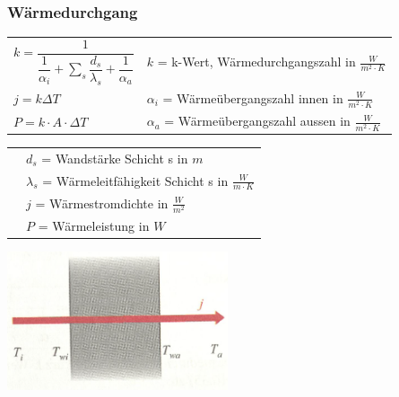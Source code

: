		\subsubsection{Wärmedurchgang}
			\begin{minipage}{12cm}
					\renewcommand{\arraystretch}{2.5}
					\begin{tabular}{ p{4cm} | p{7cm}}
						$k = \dfrac{1}{\dfrac{1}{\alpha_i} + \sum\limits_{s}\dfrac{d_s}{\lambda_s} + \dfrac{1}{\alpha_a}}$	&	$k$ = k-Wert, Wärmedurchgangszahl in $\frac{W}{m^2 \cdot K}$\\
						$j = k \Delta T$	&	$\alpha_i$ = Wärmeübergangszahl innen in $\frac{W}{m^2 \cdot K}$\\
						$P = k \cdot A \cdot \Delta T$	& $\alpha_a$ = Wärmeübergangszahl aussen in $\frac{W}{m^2 \cdot K}$\\
					\end{tabular}
					\renewcommand{\arraystretch}{1.5}
					\begin{tabular}{ p{4cm} | p{7cm} }
						& $d_s$ = Wandstärke Schicht s in $m$\\
						& $\lambda_s$ = Wärmeleitfähigkeit Schicht s in $\frac{W}{m \cdot K}$\\
						& $j$ = Wärmestromdichte in $\frac{W}{m^2}$\\
						& $P$ = Wärmeleistung in $W$\\
					\end{tabular} 
					\renewcommand{\arraystretch}{1}
			\end{minipage}
			\begin{minipage}{10cm}
				\vspace{-\ht\strutbox}\includegraphics[width=6.5cm]{./bilder/Waermedurchgang.png}
			\end{minipage}
			\newline
			\newline
			\newline
			\newline
